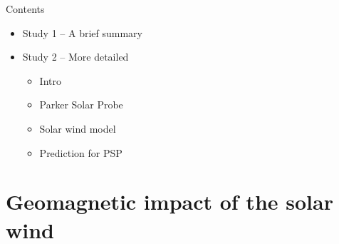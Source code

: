 \begin{frame}[c]{Contents}{}
	\begin{itemize}
		\item Study 1 -- A brief summary
		\item Study 2 -- More detailed
		\begin{itemize}
			\item Intro
			\item Parker Solar Probe
			\item Solar wind model
			\item Prediction for PSP
		\end{itemize}
	\end{itemize}
\end{frame}


\section{Geomagnetic impact of the solar wind}

